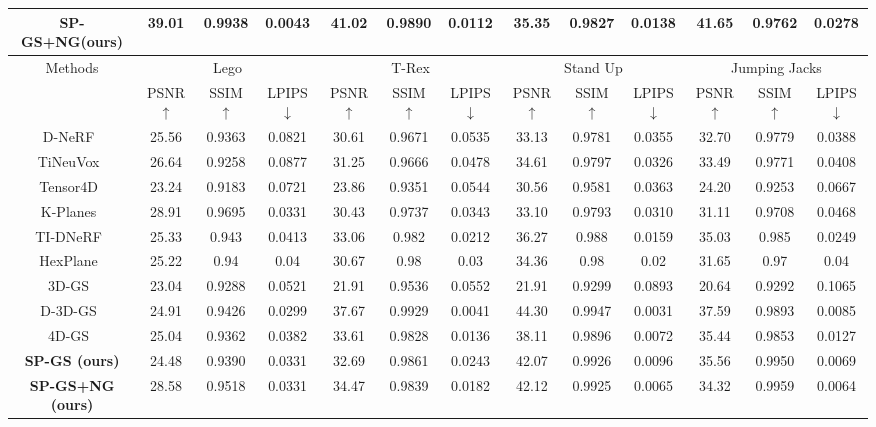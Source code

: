 \begin{table}[t]
{\begin{tabular}{c|*{3}{c}|*{3}{c}|*{3}{c}|*{3}{c}}
    \textbf{SP-GS+NG(ours)} & 39.01 & 0.9938 & 0.0043 & 41.02 & 0.9890 & 0.0112 & 35.35 & 0.9827 & 0.0138 & 41.65 & 0.9762 & 0.0278  \\
    \bottomrule
    \multirow{2}{*}{Methods} & \multicolumn{3}{c|}{Lego}  &\multicolumn{3}{c|}{T-Rex} &\multicolumn{3}{c|}{Stand Up} &  \multicolumn{3}{c}{Jumping Jacks} \\
    & PSNR $\uparrow$ & SSIM$\uparrow$ & LPIPS$\downarrow$& PSNR $\uparrow$ & SSIM$\uparrow$ & LPIPS$\downarrow$& PSNR $\uparrow$ & SSIM$\uparrow$ & LPIPS$\downarrow$& PSNR $\uparrow$ & SSIM$\uparrow$ & LPIPS$\downarrow$ \\
    \midrule 
    D-NeRF~\cite{D-NeRF} &   25.56&  0.9363 & 0.0821 & 30.61 & 0.9671 & 0.0535 & 33.13 & 0.9781 & 0.0355 & 32.70 & 0.9779 & 0.0388  \\
    TiNeuVox~\cite{TiNeuVox} & 26.64 & 0.9258 & 0.0877 & 31.25 & 0.9666 & 0.0478 & 34.61 & 0.9797 & 0.0326 & 33.49 & 0.9771 & 0.0408  \\
    Tensor4D~\cite{Tensor4D} & 23.24 & 0.9183 & 0.0721 & 23.86&  0.9351 & 0.0544 & 30.56 & 0.9581 & 0.0363 & 24.20 & 0.9253 & 0.0667 \\
    K-Planes~\cite{KPlanes} & 28.91 & 0.9695 & 0.0331 & 30.43 & 0.9737 & 0.0343 & 33.10 & 0.9793 & 0.0310 & 31.11 & 0.9708 & 0.0468 \\
    TI-DNeRF~\cite{TI-DNeRF} &25.33 & 0.943 & 0.0413 & 33.06 & 0.982 & 0.0212 & 36.27 & 0.988 & 0.0159 &35.03& 0.985 & 0.0249 \\
    HexPlane~\cite{HexPlane} &
    25.22 & 0.94 & 0.04 & 30.67 & 0.98 & 0.03 & 34.36 & 0.98 & 0.02 & 31.65 & 0.97 & 0.04  \\
    3D-GS~\cite{3D-GS} & 23.04 & 0.9288 & 0.0521 & 21.91 & 0.9536 & 0.0552 & 21.91 & 0.9299 & 0.0893 & 20.64 & 0.9292 & 0.1065 \\
    D-3D-GS~\cite{Deformable3DGS} & 24.91 & 0.9426 & 0.0299 & 37.67 & 0.9929 & 0.0041 & 44.30 & 0.9947 & 0.0031 & 37.59 & 0.9893 & 0.0085  \\
    4D-GS~\cite{RealTime4DGS} &  25.04 & 0.9362 & 0.0382 & 33.61 & 0.9828 & 0.0136 & 38.11 & 0.9896 & 0.0072 & 35.44 & 0.9853 & 0.0127\\
    \textbf{SP-GS (ours)}    & 24.48 & 0.9390 & 0.0331 & 32.69 & 0.9861 & 0.0243 & 42.07 & 0.9926 & 0.0096 & 35.56 & 0.9950 & 0.0069 \\
    \textbf{SP-GS+NG (ours)} & 28.58 & 0.9518 & 0.0331 & 34.47 & 0.9839 & 0.0182 & 42.12 & 0.9925 & 0.0065 & 34.32 & 0.9959 & 0.0064  \\
    \bottomrule
    \end{tabular}
    }
\end{table}

